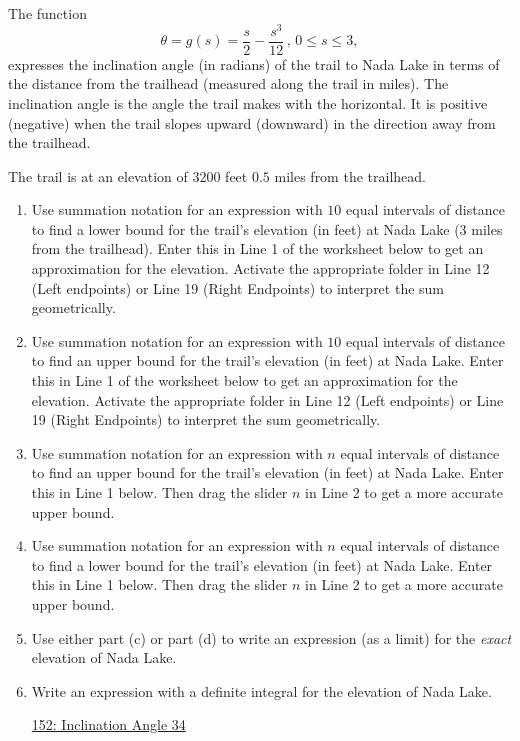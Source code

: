 \documentclass{ximera}
\begin{document}
\begin{question}  \label{QIIIUER3355}
The function
\[
      \theta = g(s) = \frac{s}{2} - \frac{s^3}{12} \, , \, 0\leq s \leq 3 , 
\]
expresses the inclination angle (in radians) of the trail to Nada Lake in terms of the distance from the trailhead (measured along the trail in miles). The inclination angle is the angle the trail makes with the horizontal. It is positive (negative) when the trail slopes upward (downward) in the direction away from the trailhead.

The trail is at an elevation of $3200$ feet $0.5$ miles from the trailhead.

\begin{enumerate}
\item Use summation notation for an expression with $10$ equal intervals of distance to find a lower bound for the trail's elevation (in feet) at Nada Lake (3 miles from the trailhead). Enter this in Line 1 of the worksheet below to get an approximation for the elevation. Activate the appropriate folder in Line 12 (Left endpoints) or Line 19 (Right Endpoints) to interpret the sum geometrically.

\item Use summation notation for an expression with $10$ equal intervals of distance to find an upper bound for the trail's elevation (in feet) at Nada Lake. Enter this in Line 1 of the worksheet below to get an approximation for the elevation. Activate the appropriate folder in Line 12 (Left endpoints) or Line 19 (Right Endpoints) to interpret the sum geometrically.


\item  Use summation notation for an expression with $n$ equal intervals of distance to find an upper bound for the trail's elevation (in feet) at Nada Lake. Enter this in Line 1 below. Then drag the slider $n$ in Line 2 to get a more accurate upper bound.

\item Use summation notation for an expression with $n$ equal intervals of distance to find a lower bound for the trail's elevation (in feet) at Nada Lake. Enter this in Line 1 below. Then drag the slider $n$ in Line 2 to get a more accurate upper bound.

\item Use either part (c) or part (d) to write an expression (as a limit) for the \emph{exact} elevation of Nada Lake.

\item Write an expression with a definite integral for the elevation of Nada Lake.
\begin{onlineOnly}
    \begin{center}
\end{center}
\end{onlineOnly}
 
\href{https://www.desmos.com/calculator/qhyco8cuou}{152: Inclination Angle 34}

\end{enumerate}
\end{question}
\end{document}
